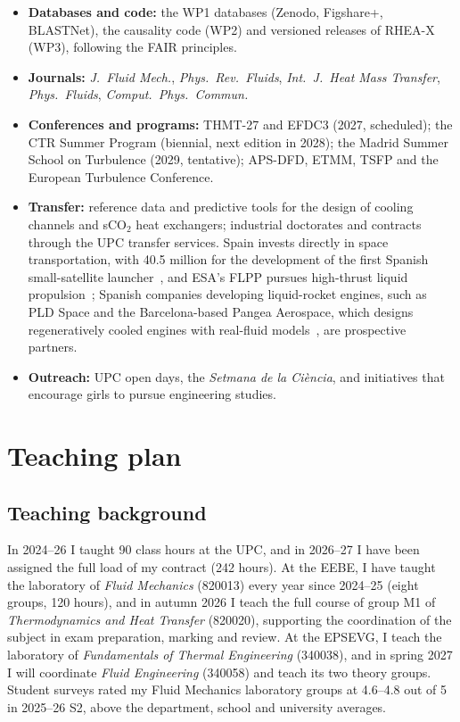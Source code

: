 \documentclass[11pt]{article}
\begin{document}
\begin{itemize}
  \item \textbf{Databases and code:} the WP1 databases (Zenodo, Figshare+, BLASTNet), the
  causality code (WP2) and versioned releases of RHEA-X (WP3), following the FAIR principles.
  \item \textbf{Journals:} \emph{J.\ Fluid Mech.}, \emph{Phys.\ Rev.\ Fluids}, \emph{Int.\ J.\
  Heat Mass Transfer}, \emph{Phys.\ Fluids}, \emph{Comput.\ Phys.\ Commun.}
  \item \textbf{Conferences and programs:} THMT-27 and EFDC3 (2027, scheduled); the CTR Summer
  Program (biennial, next edition in 2028); the Madrid Summer School on Turbulence (2029,
  tentative); APS-DFD, ETMM, TSFP and the European Turbulence Conference.
  \item \textbf{Transfer:} reference data and predictive tools for the design of cooling
  channels and sCO$_2$ heat exchangers; industrial doctorates and contracts through the UPC
  transfer services. Spain invests directly in space transportation, with \texteuro{}40.5
  million for the development of the first Spanish small-satellite launcher~\cite{CDTI2024},
  and ESA's FLPP pursues high-thrust liquid propulsion~\cite{ESA2026}; Spanish companies
  developing liquid-rocket engines, such as PLD Space and the Barcelona-based Pangea Aerospace,
  which designs regeneratively cooled engines with real-fluid models~\cite{Esnault2021}, are
  prospective partners.
  \item \textbf{Outreach:} UPC open days, the \emph{Setmana de la Ci\`encia}, and initiatives
  that encourage girls to pursue engineering studies.
\end{itemize}

\section{Teaching plan}\label{sec:teaching}

\subsection{Teaching background}
In 2024--26 I taught 90 class hours at the UPC, and in 2026--27 I have been assigned the full
load of my contract (242 hours). At the EEBE, I have taught the laboratory of \emph{Fluid
Mechanics} (820013) every year since 2024--25 (eight groups, 120 hours), and in autumn
2026 I teach the full course of group M1 of \emph{Thermodynamics and Heat Transfer}
(820020), supporting the coordination of the subject in exam preparation, marking and
review. At the EPSEVG, I teach the laboratory of \emph{Fundamentals of Thermal
Engineering} (340038), and in spring 2027 I will coordinate \emph{Fluid Engineering}
(340058) and teach its two theory groups. Student surveys rated my Fluid Mechanics
laboratory groups at 4.6--4.8 out of 5 in 2025--26 S2, above the department, school and
university averages.
\end{document}
